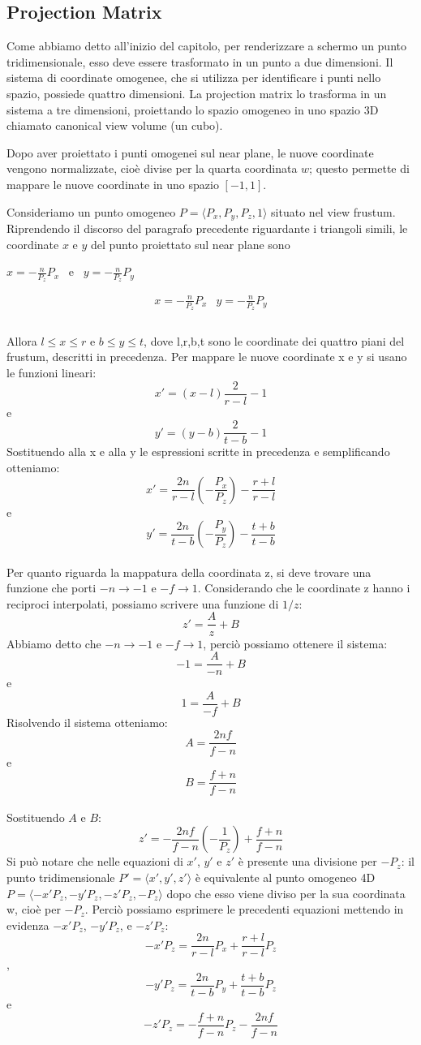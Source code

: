 \subsection{Projection Matrix}
Come abbiamo detto all'inizio del capitolo, per renderizzare a schermo un punto tridimensionale, esso deve essere trasformato in un punto a due dimensioni. Il sistema di coordinate omogenee,  che si utilizza per identificare i punti nello spazio, possiede quattro dimensioni. La projection matrix lo trasforma in un sistema a tre dimensioni, proiettando lo spazio omogeneo in uno spazio 3D chiamato canonical view volume (un cubo).

Dopo aver proiettato i punti omogenei sul near plane, le nuove coordinate vengono normalizzate, cioè divise per la quarta coordinata $w$; questo permette di mappare le nuove coordinate in uno spazio $[-1,1]$.

Consideriamo un punto omogeneo $P=\langle P_x,P_y,P_z,1\rangle$ situato nel view frustum.
Riprendendo il discorso del paragrafo precedente riguardante i triangoli simili,  le coordinate $x$ e $y$ del punto proiettato sul near plane sono
\begin{center}
$x=-\frac{n}{P_z}{P_x}$ \,\,\,e\,\,\,  $y=-\frac{n}{P_z}{P_y}$
\end{center}
$$\begin{array}{cc}
x=-\frac{n}{P_z}{P_x} & y=-\frac{n}{P_z}{P_y}\\
\end{array}$$\\


Allora $l\leq x\leq r$ e $b\leq y\leq t$, dove l,r,b,t sono le coordinate dei quattro piani del frustum, descritti in precedenza.
Per mappare le nuove coordinate x e y si usano le funzioni lineari:
$$x'=(x-l)\frac{2}{r-l}-1$$ e $$y'=(y-b)\frac{2}{t-b}-1$$
Sostituendo alla x e alla y le espressioni scritte in precedenza e semplificando otteniamo:
$$x'=\frac{2n}{r-l}\left(-\frac{P_x}{P_z}\right)-\frac{r+l}{r-l}$$ e 
$$y'=\frac{2n}{t-b}\left(-\frac{P_y}{P_z}\right)-\frac{t+b}{t-b}$$\\
Per quanto riguarda la mappatura della coordinata z, si deve trovare una funzione che porti $-n\rightarrow -1$ e $-f\rightarrow 1$.
Considerando che le coordinate z hanno i reciproci interpolati, possiamo scrivere una funzione di $1/z$:
$$z'=\frac{A}{z}+B$$
Abbiamo detto che $-n\rightarrow -1$ e $-f\rightarrow 1$, perciò possiamo ottenere il sistema:
$$-1=\frac{A}{-n}+B$$ e $$1=\frac{A}{-f}+B$$
Risolvendo il sistema otteniamo:
$$A=\frac{2nf}{f-n}$$ e $$B=\frac{f+n}{f-n}$$\\
Sostituendo $A$ e $B$:
$$z'=-\frac{2nf}{f-n}\left(-\frac{1}{P_z}\right)+\frac{f+n}{f-n}$$
Si può notare che nelle equazioni di $x'$, $y'$ e $z'$ è presente una divisione per $-P_z$: il punto tridimensionale $P'=\langle x',y',z'\rangle$ è equivalente al punto omogeneo 4D $P=\langle -x'P_z,-y'P_z,-z'P_z,-P_z\rangle$ dopo che esso viene diviso per la sua coordinata w, cioè per $-P_z$.
Perciò possiamo esprimere le precedenti equazioni mettendo in evidenza $-x'P_z$, $-y'P_z$, e $-z'P_z$:
$$-x'P_z=\frac{2n}{r-l}P_x+\frac{r+l}{r-l}P_z$$, 
$$-y'P_z=\frac{2n}{t-b}P_y+\frac{t+b}{t-b}P_z$$e
$$-z'P_z=-\frac{f+n}{f-n}P_z-\frac{2nf}{f-n}$$

